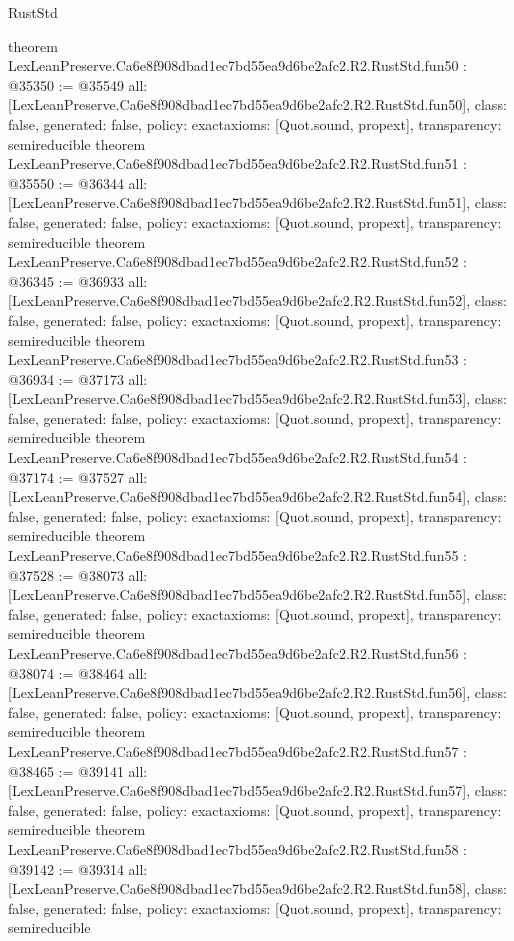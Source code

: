 \begin{lexlean}{RustStd}
\begin{coremodule}
{}
theorem LexLeanPreserve.Ca6e8f908dbad1ec7bd55ea9d6be2afc2.R2.RustStd.fun50 : @35350 := @35549 {
  all: [LexLeanPreserve.Ca6e8f908dbad1ec7bd55ea9d6be2afc2.R2.RustStd.fun50],
  class: false,
  generated: false,
  policy: exact{axioms: [Quot.sound, propext]},
  transparency: semireducible
}
theorem LexLeanPreserve.Ca6e8f908dbad1ec7bd55ea9d6be2afc2.R2.RustStd.fun51 : @35550 := @36344 {
  all: [LexLeanPreserve.Ca6e8f908dbad1ec7bd55ea9d6be2afc2.R2.RustStd.fun51],
  class: false,
  generated: false,
  policy: exact{axioms: [Quot.sound, propext]},
  transparency: semireducible
}
theorem LexLeanPreserve.Ca6e8f908dbad1ec7bd55ea9d6be2afc2.R2.RustStd.fun52 : @36345 := @36933 {
  all: [LexLeanPreserve.Ca6e8f908dbad1ec7bd55ea9d6be2afc2.R2.RustStd.fun52],
  class: false,
  generated: false,
  policy: exact{axioms: [Quot.sound, propext]},
  transparency: semireducible
}
theorem LexLeanPreserve.Ca6e8f908dbad1ec7bd55ea9d6be2afc2.R2.RustStd.fun53 : @36934 := @37173 {
  all: [LexLeanPreserve.Ca6e8f908dbad1ec7bd55ea9d6be2afc2.R2.RustStd.fun53],
  class: false,
  generated: false,
  policy: exact{axioms: [Quot.sound, propext]},
  transparency: semireducible
}
theorem LexLeanPreserve.Ca6e8f908dbad1ec7bd55ea9d6be2afc2.R2.RustStd.fun54 : @37174 := @37527 {
  all: [LexLeanPreserve.Ca6e8f908dbad1ec7bd55ea9d6be2afc2.R2.RustStd.fun54],
  class: false,
  generated: false,
  policy: exact{axioms: [Quot.sound, propext]},
  transparency: semireducible
}
theorem LexLeanPreserve.Ca6e8f908dbad1ec7bd55ea9d6be2afc2.R2.RustStd.fun55 : @37528 := @38073 {
  all: [LexLeanPreserve.Ca6e8f908dbad1ec7bd55ea9d6be2afc2.R2.RustStd.fun55],
  class: false,
  generated: false,
  policy: exact{axioms: [Quot.sound, propext]},
  transparency: semireducible
}
theorem LexLeanPreserve.Ca6e8f908dbad1ec7bd55ea9d6be2afc2.R2.RustStd.fun56 : @38074 := @38464 {
  all: [LexLeanPreserve.Ca6e8f908dbad1ec7bd55ea9d6be2afc2.R2.RustStd.fun56],
  class: false,
  generated: false,
  policy: exact{axioms: [Quot.sound, propext]},
  transparency: semireducible
}
theorem LexLeanPreserve.Ca6e8f908dbad1ec7bd55ea9d6be2afc2.R2.RustStd.fun57 : @38465 := @39141 {
  all: [LexLeanPreserve.Ca6e8f908dbad1ec7bd55ea9d6be2afc2.R2.RustStd.fun57],
  class: false,
  generated: false,
  policy: exact{axioms: [Quot.sound, propext]},
  transparency: semireducible
}
theorem LexLeanPreserve.Ca6e8f908dbad1ec7bd55ea9d6be2afc2.R2.RustStd.fun58 : @39142 := @39314 {
  all: [LexLeanPreserve.Ca6e8f908dbad1ec7bd55ea9d6be2afc2.R2.RustStd.fun58],
  class: false,
  generated: false,
  policy: exact{axioms: [Quot.sound, propext]},
  transparency: semireducible
}
\end{coremodule}
\end{lexlean}
